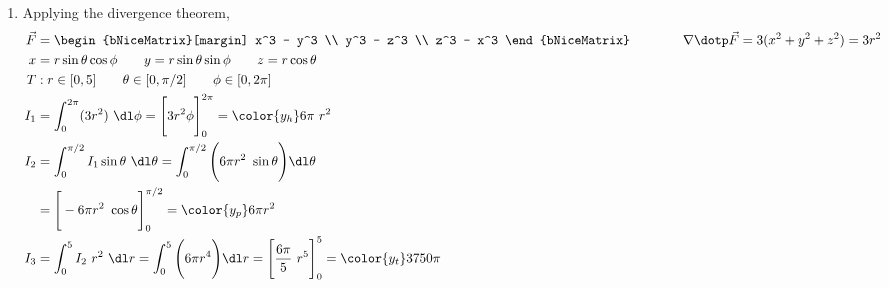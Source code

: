 \begin{enumerate}
    \item Applying the divergence theorem,
          \begin{align}
              \vec{F} & = \begin{bNiceMatrix}[margin]
                              x^3 - y^3 \\ y^3 - z^3 \\ z^3 - x^3
                          \end{bNiceMatrix} \qquad\qquad
              \nabla \dotp \vec{F} = 3(x^2 + y^2 + z^2) = 3r^2                     \\
              x       & = r\sin \theta \cos \phi \qquad y = r\sin \theta \sin \phi
              \qquad z = r\cos \theta                                              \\
              T       & : r \in [0, 5] \qquad \theta \in [0, \pi/2]
              \qquad \phi \in [0, 2\pi]                                            \\
              I_1     & = \int_{0}^{2\pi} (3r^2) \ \dl \phi
              = \Bigg[ 3r^2 \phi \Bigg]_{0}^{2\pi}
              = {\color{y_h} 6\pi\ r^2}                                            \\
              I_2     & = \int_{0}^{\pi/2} I_1 \sin \theta\ \dl \theta
              = \int_{0}^{\pi/2} \Bigg( 6\pi r^2\ \sin \theta \Bigg) \dl \theta    \\
                      & = \Bigg[ -6\pi r^2\ \cos \theta \Bigg]_{0}^{\pi/2}
              = {\color{y_p} 6\pi r^2 }                                            \\
              I_3     & = \int_{0}^{5} I_2\ r^2\ \dl r = \int_{0}^{5}
              \Bigg( 6\pi r^4 \Bigg) \dl r
              = \Bigg[ \frac{6\pi}{5}\ r^5 \Bigg]_{0}^{5}
              = {\color{y_t} 3750 \pi }
          \end{align}


\end{enumerate}
